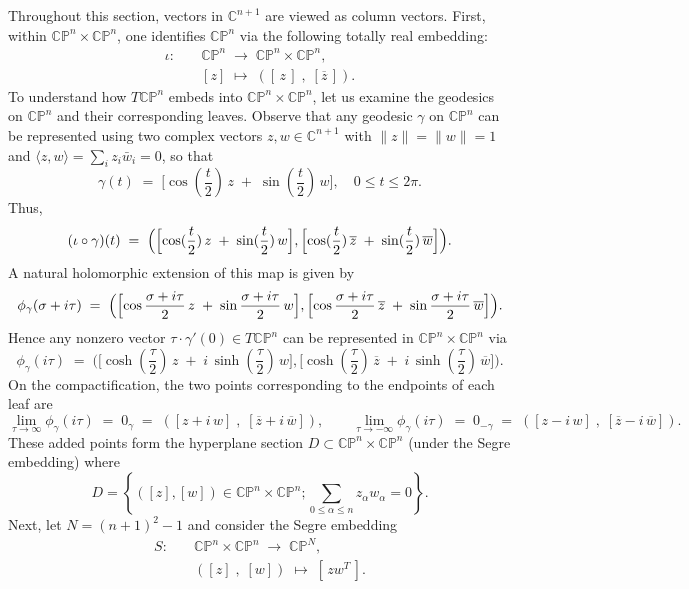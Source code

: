 \documentclass[a4paper, 12pt]{article}
\newcommand{\bC}{\mathbb{C}}
\newcommand{\bCP}{\mathbb{CP}^n}
\newcommand{\tCP}{\mathbb{CP}^n\times\mathbb{CP}^n}
\begin{document}
Throughout this section, vectors in $\mathbb C^{n+1}$ are viewed as column vectors. First, within $\tCP$, one identifies $\bCP$ via the following totally real embedding:
\[
\begin{aligned}
\iota:\quad & \bCP \;\longrightarrow\;\tCP, \\
& [z]\;\longmapsto\;([\,z\,]\;,\;[\overline{z}\,]).
\end{aligned}
\]
To understand how \(T\bCP\) embeds into \(\tCP\), let us examine the geodesics on \(\bCP\) and their corresponding leaves. Observe that any geodesic \(\gamma\) on \(\bCP\) can be represented using two complex vectors \(z,w\in\bC^{n+1}\) with \(\|z\|=\|w\|=1\) and \(\langle z,w\rangle=\sum_i z_i \bar{w}_i=0\), so that
\[
\gamma(t)\;=\;\bigl[\cos(\frac{t}{2})\,z \;+\;\sin(\frac{t}{2})\,w\bigr],\quad 0\le t\le 2\pi.
\]
Thus,
\[
(\iota\circ\gamma)(t)\;=\;\Bigl(\Bigl[\cos(\frac{t}{2})\,z \;+\;\sin(\frac{t}{2})\,w\Bigr]
,
\Bigl[\cos(\frac{t}{2})\,\overline{z} \;+\;\sin(\frac{t}{2})\,\overline{w}\Bigr]\Bigr).
\]
A natural holomorphic extension of this map is given by
\[
\phi_{\gamma}(\sigma+i\tau)
\;=\;
\Bigl(\Bigl[\cos\frac{\sigma+i\tau}{2}\,z \;+\;\sin\frac{\sigma+i\tau}{2}\,w\Bigr]
,
\Bigl[\cos\frac{\sigma+i\tau}{2}\,\overline{z} \;+\;\sin\frac{\sigma+i\tau}{2}\,\overline{w}\Bigr]\Bigr).
\]
Hence any nonzero vector \(\tau\cdot\gamma'(0)\in T\bCP\) can be represented in \(\tCP\) via
\[
\phi_{\gamma}(i\tau)
\;=\;
\bigl(\bigl[\cosh(\frac{\tau}{2})\,z \;+\; i\,\sinh(\frac{\tau}{2})\,w\bigr]
,
\bigl[\cosh(\frac{\tau}{2})\,\overline{z} \;+\;i\,\sinh(\frac{\tau}{2})\,\overline{w}\bigr]\bigr).
\]
On the compactification, the two points corresponding to the endpoints of each leaf  %
are
\[
\lim_{\tau\to\infty}\phi_{\gamma}(i\tau)
\;=\;
0_\gamma\;=\;
([z + i\,w]\;,\;[\overline{z} + i\,\overline{w}]),
\qquad
\lim_{\tau\to -\infty}\phi_{\gamma}(i\tau)
\;=\;
0_{-\gamma}
\;=\;
([z - i\,w]\;,\;[\overline{z} - i\,\overline{w}]).
\]
These added points form the hyperplane section $D\subset \tCP$ (under the Segre embedding) where
\begin{equation}\label{eq-Dmodel}
    D=\left\{([z], [w])\in \tCP; \sum_{0\le \alpha\le n}z_{\alpha}w_{\alpha}=0\right\}.
\end{equation}
Next, let \(N=(n+1)^2-1\) and consider the Segre embedding
\[
\begin{aligned}
S:\quad & \tCP \;\longrightarrow\;\mathbb{CP}^N,\\
& ([z]\;,\;[w]) \;\longmapsto\; [\,z w^T\,].
\end{aligned}
\]
\end{document}
